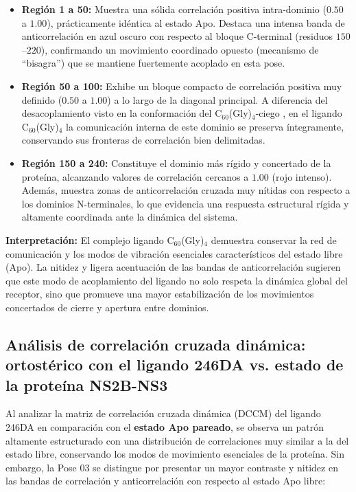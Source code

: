 \begin{itemize}
    \item \textbf{Región 1 a 50:} Muestra una sólida correlación positiva intra-dominio ($0.50$ a $1.00$), prácticamente idéntica al estado Apo. Destaca una intensa banda de anticorrelación en azul oscuro  con respecto al bloque C-terminal (residuos $150$--$220$), confirmando un movimiento coordinado opuesto (mecanismo de ``bisagra'') que se mantiene fuertemente acoplado en esta pose.
    
    \item \textbf{Región 50 a 100:} Exhibe un bloque compacto de correlación positiva muy definido ($0.50$ a $1.00$) a lo largo de la diagonal principal. A diferencia del desacoplamiento visto en la conformación del C$_{60}$(Gly)$_{4}$-ciego , en el ligando C$_{60}$(Gly)$_{4}$ la comunicación interna de este dominio se preserva íntegramente, conservando sus fronteras de correlación bien delimitadas.
    
    \item \textbf{Región 150 a 240:} Constituye el dominio más rígido y concertado de la proteína, alcanzando valores de correlación cercanos a $1.00$ (rojo intenso). Además, muestra zonas de anticorrelación cruzada muy nítidas con respecto a los dominios N-terminales, lo que evidencia una respuesta estructural rígida y altamente coordinada ante la dinámica del sistema.
\end{itemize}

\textbf{Interpretación:} El complejo ligando C$_{60}$(Gly)$_{4}$ demuestra conservar la red de comunicación y los modos de vibración esenciales característicos del estado libre (Apo). La nitidez y ligera acentuación de las bandas de anticorrelación sugieren que este modo de acoplamiento del ligando no solo respeta la dinámica global del receptor, sino que promueve una mayor estabilización de los movimientos concertados de cierre y apertura entre dominios.

\subsection*{Análisis de correlación cruzada dinámica: ortostérico con el ligando 246DA  vs. estado de la proteína NS2B-NS3}

Al analizar la matriz de correlación cruzada dinámica (DCCM) del ligando 246DA en comparación con el \textbf{estado Apo pareado}, se observa un patrón altamente estructurado con una distribución de correlaciones muy similar a la del estado libre, conservando los modos de movimiento esenciales de la proteína. Sin embargo, la Pose 03 se distingue por presentar un mayor contraste y nitidez en las bandas de correlación y anticorrelación con respecto al estado Apo libre:


